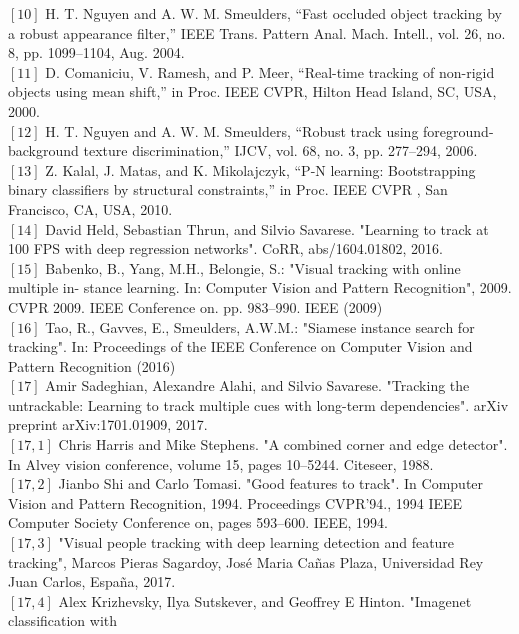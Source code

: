 \documentclass{bmvc2k}
\begin{document}
$\left[10\right]$  H.  T.  Nguyen  and  A.  W.  M.  Smeulders,  “Fast  occluded  object tracking by a robust appearance filter,”
IEEE Trans. Pattern Anal. Mach. Intell., vol. 26, no. 8, pp. 1099–1104, Aug. 2004.\\
$\left[11\right]$  D.  Comaniciu,  V.  Ramesh,  and  P.  Meer,  “Real-time  tracking  of non-rigid objects using mean shift,” in
Proc. IEEE CVPR, Hilton Head Island, SC, USA, 2000.\\
$\left[12\right]$  H.  T.  Nguyen  and  A.  W.  M.  Smeulders,  “Robust  track  using foreground-background  texture discrimination,” IJCV,  vol.  68, no. 3, pp. 277–294, 2006.\\
$\left[13\right]$  Z.    Kalal,    J.    Matas,    and    K.    Mikolajczyk,    “P-N    learning:
Bootstrapping  binary  classifiers  by  structural  constraints,”  in
Proc. IEEE CVPR
, San Francisco, CA, USA, 2010.\\
$\left[14\right]$  David Held, Sebastian Thrun, and Silvio Savarese. "Learning to track at 100 FPS
with deep regression networks". CoRR, abs/1604.01802, 2016.\\
$\left[15\right]$  Babenko,  B.,  Yang,  M.H.,  Belongie,  S.:  "Visual  tracking  with  online  multiple  in-
stance learning. In: Computer Vision and Pattern Recognition", 2009. CVPR 2009.
IEEE Conference on. pp. 983–990. IEEE (2009)\\
$\left[16\right]$  Tao, R., Gavves, E., Smeulders, A.W.M.: "Siamese instance search for tracking". In:
Proceedings of the IEEE Conference on Computer Vision and Pattern Recognition
(2016)\\
$\left[17\right]$  Amir Sadeghian, Alexandre Alahi, and Silvio Savarese. "Tracking the untrackable:
Learning to track multiple cues with long-term dependencies".
arXiv preprint
arXiv:1701.01909, 2017.\\
$\left[17,1\right]$  Chris Harris and Mike Stephens. "A combined corner and edge detector". In Alvey
vision conference, volume 15, pages 10–5244. Citeseer, 1988.\\
$\left[17,2\right]$  Jianbo Shi and Carlo Tomasi. "Good features to track". In Computer Vision and
Pattern Recognition, 1994. Proceedings CVPR’94., 1994 IEEE Computer Society
Conference on, pages 593–600. IEEE, 1994.\\
$\left[17,3\right]$  "Visual people tracking with deep learning
detection and feature tracking", Marcos Pieras Sagardoy, José Maria Cañas Plaza, Universidad Rey Juan Carlos, España, 2017.\\
$\left[17,4\right]$  Alex Krizhevsky, Ilya Sutskever, and Geoffrey E Hinton. "Imagenet classification with
\end{document}

